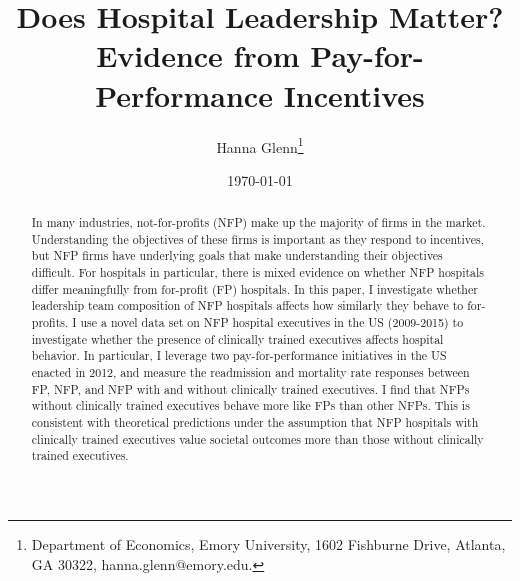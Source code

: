 \documentclass[12pt]{article}
\begin{document}
	
	
	
	
	\linespread{1.2}\title{\vspace{-0.5in} Does Hospital Leadership Matter?\\ \large Evidence from Pay-for-Performance Incentives} 
	
	\date{\today}
	
	\author{\vspace{10mm}Hanna Glenn\footnote{Department of Economics, Emory University, 1602 Fishburne Drive, Atlanta, GA 30322, hanna.glenn@emory.edu.} }
	
	\maketitle
	
	\vspace{-0.2in}
	
	\singlespacing\maketitle


 \vspace{3mm}
	
    \begin{abstract}
		{\small
        In many industries, not-for-profits (NFP) make up the majority of firms in the market. Understanding the objectives of these firms is important as they respond to incentives, but NFP firms have underlying goals that make understanding their objectives difficult. For hospitals in particular, there is mixed evidence on whether NFP hospitals differ meaningfully from for-profit (FP) hospitals. In this paper, I investigate whether leadership team composition of NFP hospitals affects how similarly they behave to for-profits. I use a novel data set on NFP hospital executives in the US (2009-2015) to investigate whether the presence of clinically trained executives affects hospital behavior. In particular, I leverage two pay-for-performance initiatives in the US enacted in 2012, and measure the  readmission and mortality rate responses between FP, NFP, and NFP with and without clinically trained executives. I find that NFPs without clinically trained executives behave more like FPs than other NFPs. This is consistent with theoretical predictions under the assumption that NFP hospitals with clinically trained executives value societal outcomes more than those without clinically trained executives.
		} 
	\end{abstract}
	
\end{document}
